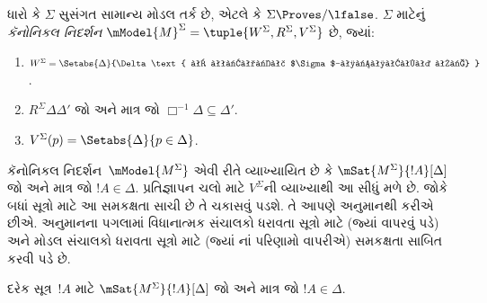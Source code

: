 \begin{defn}
  ધારો કે $\Sigma$ સુસંગત સામાન્ય મોડલ તર્ક છે, એટલે કે
  $\Sigma \Proves/ \lfalse$. $\Sigma$ માટેનું
  \emph{કૅનોનિકલ નિદર્શન} $\mModel{M}^\Sigma =
  \tuple{W^\Sigma, R^\Sigma, V^\Sigma}$ છે, જ્યાં:
  \begin{enumerate}
  \item $W^\Sigma = \Setabs{ \Delta }{\Delta \text{
      એ પૂર્ણ $\Sigma$-સુસંગત છે} }$.
  \item $R^\Sigma \Delta\Delta'$ જો અને માત્ર જો
    $\Box^{-1}\Delta \subseteq
      \Delta'$.
  \item $V^\Sigma(p) = \Setabs{\Delta}{p \in \Delta}$.
  \end{enumerate}
\end{defn}

\endgroup

\begingroup
\makeatletter{}\makeatother


\label{guunit:OLP-0447}


કૅનોનિકલ નિદર્શન~$\mModel{M^\Sigma}$ એવી રીતે વ્યાખ્યાયિત છે કે
$\mSat{M^\Sigma}{!A}[\Delta]$ જો અને માત્ર જો $!A \in \Delta$.
પ્રતિજ્ઞાપન ચલો માટે $V^\Sigma$ની વ્યાખ્યાથી આ સીધું
મળે છે. જોકે બધાં સૂત્રો માટે આ સમકક્ષતા સાચી છે તે ચકાસવું
પડશે. તે આપણે અનુમાનથી કરીએ છીએ. અનુમાનના પગલામાં વિધાનાત્મક
સંચાલકો ધરાવતા સૂત્રો માટે (જ્યાં
 વાપરવું પડે) અને મોડલ સંચાલકો
ધરાવતા સૂત્રો માટે (જ્યાં નાં પરિણામો વાપરીએ)
સમકક્ષતા સાબિત કરવી પડે છે.

\begin{prop}[સત્યતા સહાયક પ્રમેય]
  દરેક સૂત્ર~$!A$ માટે $\mSat{M^\Sigma}{!A}[\Delta]$ જો અને
  માત્ર જો $!A \in \Delta$.
\end{prop}

